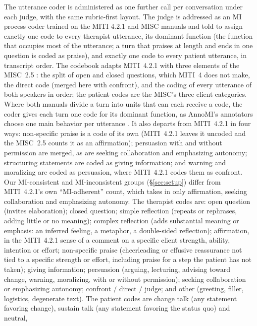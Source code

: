 The utterance coder is administered as one further call per conversation under each judge, with
the same rubric-first layout. The judge is addressed as an MI process coder trained on the MITI
4.2.1 and MISC manuals and told to assign exactly one code to every therapist utterance, its
dominant function (the function that occupies most of the utterance; a turn that praises at
length and ends in one question is coded as praise), and exactly one code to every patient
utterance, in transcript order. The codebook adapts MITI~4.2.1
\citep{moyers2016miti,moyers2016miti4} with three elements of the MISC~2.5 \citep{houck2010misc}:
the split of open and closed questions, which MITI~4 does not make, the direct code (merged here
with confront), and the coding of every utterance of both speakers in order; the patient codes are
the MISC's three client categories. Where both manuals divide a turn into units that can each
receive a code, the coder gives each turn one code for its dominant function, as AnnoMI's
annotators choose one main behavior per utterance \citep{wu2022annomi}. It also departs from
MITI~4.2.1 in four ways: non-specific praise is a code of its own (MITI~4.2.1 leaves it uncoded and
the MISC~2.5 counts it as an affirmation); persuasion with and without permission are merged, as
are seeking collaboration and emphasizing autonomy; structuring statements are coded as giving
information; and warning and moralizing are coded as persuasion, where MITI~4.2.1 codes them as
confront. Our MI-consistent and MI-inconsistent groups (\S\ref{sec:setup}) differ from MITI~4.2.1's
own ``MI-adherent'' count, which takes in only affirmation, seeking collaboration and emphasizing
autonomy. The therapist codes are: open question (invites elaboration);
closed question; simple reflection (repeats or rephrases, adding little or no meaning); complex
reflection (adds substantial meaning or emphasis: an inferred feeling, a metaphor, a double-sided
reflection); affirmation, in the MITI~4.2.1 sense of a comment on a specific client strength,
ability, intention or effort; non-specific praise (cheerleading or effusive reassurance not tied to
a specific strength or effort, including praise for a step the patient has not taken); giving
information; persuasion (arguing, lecturing, advising toward change, warning, moralizing, with or
without permission); seeking collaboration or emphasizing autonomy; confront / direct / judge; and
other (greeting, filler, logistics, degenerate text). The patient codes are change talk (any
statement favoring change), sustain talk (any statement favoring the status quo) and neutral,
